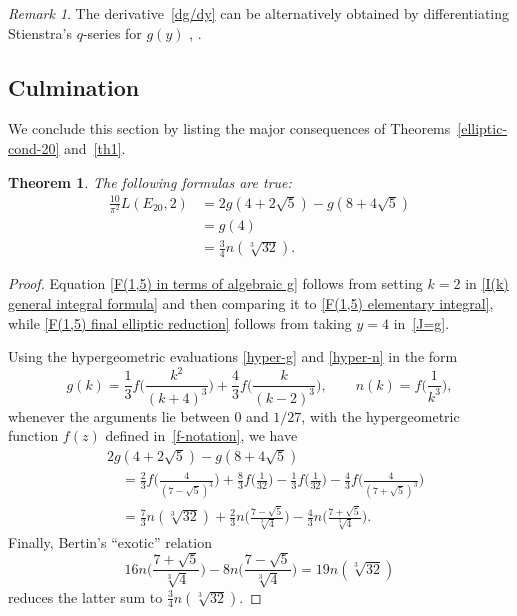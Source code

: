 \documentclass[12pt,reqno]{amsart}
\newtheorem{theorem}{Theorem}
\theoremstyle{remark}
\newtheorem*{remark}{Remark}
\begin{document}
\begin{remark}
The derivative~\eqref{dg/dy} can be alternatively obtained
by differentiating Stienstra's $q$-series for $g(y)$ \cite[Example \#6]{St},
\cite[formula~(2-11)]{LR}.
\end{remark}

\subsection{Culmination}

We conclude this section by listing the major consequences
of Theorems~\ref{elliptic-cond-20} and~\ref{th1}.

\begin{theorem}
\label{cor0}
The following formulas are true:
\begin{align}
\frac{10}{\pi^2}L(E_{20},2) &=2g(4+2\sqrt{5})-g(8+4\sqrt{5})
\label{F(1,5) in terms of algebraic g}\\
&=g(4)\label{F(1,5) final elliptic reduction}\\
&=\frac34n(\sqrt[3]{32}).\label{F(1,5) in terms of algebraic n}
\end{align}
\end{theorem}

\begin{proof}
Equation \eqref{F(1,5) in terms of algebraic g}
follows from setting $k=2$ in \eqref{I(k) general integral
formula} and then comparing it to \eqref{F(1,5) elementary
integral}, while \eqref{F(1,5) final elliptic reduction}
follows from taking $y=4$ in~\eqref{J=g}.

Using the hypergeometric evaluations \eqref{hyper-g} and \eqref{hyper-n} in the form
$$
g(k)=\frac13f\biggl(\frac{k^2}{(k+4)^3}\biggr)+\frac43f\biggl(\frac{k}{(k-2)^3}\biggr),
\qquad
n(k)=f\biggl(\frac1{k^3}\biggr),
$$
whenever the arguments lie between 0 and $1/27$,
with the hypergeometric function $f(z)$ defined in~\eqref{f-notation},
we have
\begin{align*}
&
2g(4+2\sqrt{5})-g(8+4\sqrt{5})
\\ &\quad
=\frac23f\biggl(\frac{4}{(7-\sqrt5)^3}\biggr)+\frac83f\biggl(\frac1{32}\biggr)
-\frac13f\biggl(\frac1{32}\biggr)-\frac43f\biggl(\frac{4}{(7+\sqrt5)^3}\biggr)
\\ &\quad
=\frac73n(\sqrt[3]{32})+\frac23n\biggl(\frac{7-\sqrt5}{\sqrt[3]{4}}\biggr)
-\frac43n\biggl(\frac{7+\sqrt5}{\sqrt[3]{4}}\biggr).
\end{align*}
Finally, Bertin's ``exotic'' relation \cite[Theorem~6]{GuR}
\begin{equation}
16n\biggl(\frac{7+\sqrt5}{\sqrt[3]{4}}\biggr)
-8n\biggl(\frac{7-\sqrt5}{\sqrt[3]{4}}\biggr)
=19n(\sqrt[3]{32})
\label{exotic}
\end{equation}
reduces the latter sum to $\frac34n(\sqrt[3]{32})$.
\end{proof}
\end{document}
